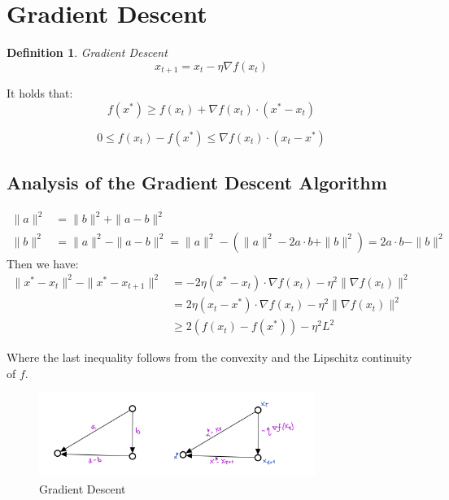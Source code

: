 \documentclass[11pt]{book} %
\newtheorem{definition}{Definition}[section]
\begin{document}
\section{Gradient Descent}
\begin{definition}{Gradient Descent} \\
    \begin{equation}
       x_{t+1} = x_t - \eta \nabla f(x_t) 
    \end{equation}
\end{definition}

It holds that:
\begin{equation}
    f(x^*) \geq f(x_t) + \nabla f(x_t) \cdot (x^* - x_t)
\end{equation}

\begin{equation}
    0 \leq f(x_t) - f(x^*) \leq \nabla f(x_t) \cdot (x_t - x^*) 
\end{equation}

\subsection{Analysis of the Gradient Descent Algorithm}

\begin{align*}
    \|a\|^2  &= \|b\|^2 + \|a - b\|^2   \\ 
    \|b\|^2 &= \|a\|^2 - \|a - b\|^2 = \|a\|^2 - ( \|a\|^2 - 2a \cdot b + \|b\|^2  ) = 2 a \cdot b - \|b\|^2
\end{align*}
Then we have:
\begin{align*}
    \| x^* - x_t \|^2 - \| x^* - x_{t+1} \|^2 &= - 2 \eta (x^* - x_t) \cdot \nabla f(x_t) - \eta^2 \| \nabla f(x_t) \|^2 \\
    &= 2 \eta (x_t - x^*) \cdot \nabla f(x_t) - \eta^2 \| \nabla f(x_t) \|^2 \\
    &\geq  2 ( f(x_t) - f(x^*) ) - \eta^2 L^2
\end{align*}

Where the last inequality follows from the convexity and the Lipschitz continuity of $f$. 

\begin{figure}[H]
    \centering
    \includegraphics[width=0.8\textwidth]{Figs/vectors_triangle.jpeg}
    \caption{Gradient Descent}
\end{figure}
\end{document}
